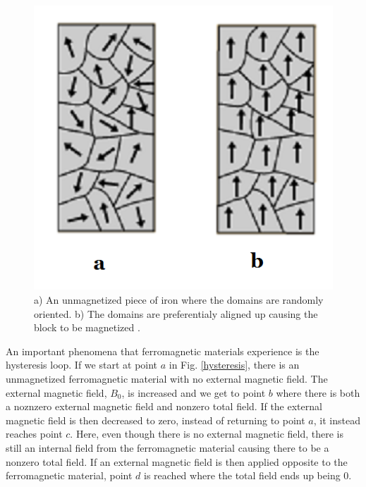 \documentclass[ notitlepage, numerical, 11pt]{revtex4-1} %
\begin{document}
\begin{figure}[H]
\centerline{\includegraphics[scale=.55]{domains.png}}
\caption{a) An unmagnetized piece of iron where the domains are randomly oriented. b) The domains are preferentialy aligned up causing the block to be magnetized \cite{hyperDomain}.}
\label{domain}
\end{figure} 
An important phenomena that ferromagnetic materials experience is the hysteresis loop. If we start at point $a$ in Fig. \ref{hysteresis}, there is an unmagnetized ferromagnetic material with no external magnetic field. The external magnetic field, $B_0$, is increased and we get to point $b$ where there is both a noznzero external magnetic field and nonzero total field. If the external magnetic field is then decreased to zero, instead of returning to point $a$, it instead reaches point $c$. Here, even though there is no external magnetic field, there is still an internal field from the ferromagnetic material causing there to be a nonzero total field. If an external magnetic field is then applied opposite to the ferromagnetic material, point $d$ is reached where the total field ends up being 0.
\end{document}
